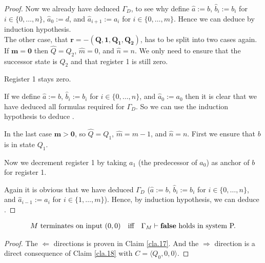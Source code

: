 \begin{proof}
	Now we already have deduced $\Gamma_D$, to see why define $\widehat{a}:=b$, $\widehat{b}_i:=b_i$ for $i\in\{0,\dots,n\}$, $\widehat{a}_0:=d$, and $\widehat{a}_{i+1}:=a_i$ for $i\in\{0,\dots,m\}$.
	Hence we can deduce \false{} by induction hypothesis.\\
	
	The other case, that $\boldsymbol{r=-(Q,1,Q_1,Q_2)}$, has to be split into two cases again. If $\boldsymbol{m=0}$ then $\widehat{Q}=Q_2$, $\widehat{m}=0$, and $\widehat{n}=n$. We only need to ensure that the successor state is $Q_2$ and that register 1 is still zero.
	
	\begin{figure}[H]
		\centering
		
	\end{figure}
	
	Register 1 stays zero.
	
	\begin{figure}[H]
		\centering
		
	\end{figure}
	
	If we define $\widehat{a}:=b$, $\widehat{b}_i:=b_i$ for $i\in\{0,\dots,n\}$, and $\widehat{a}_0:=a_0$ then it is clear that we have deduced all formulas required for $\Gamma_D$. So we can use the induction hypothesis to deduce \false{}.
	
	In the last case $\boldsymbol{m>0}$, so $\widehat{Q}=Q_1$, $\widehat{m}=m-1$, and $\widehat{n}=n$. First we ensure that $b$ is in state $Q_1$.
	
	\begin{figure}[H]
		\centering
		
	\end{figure}
	
	Now we decrement register 1 by taking $a_1$ (the predecessor of $a_0$) as anchor of $b$ for register 1.
	
	\begin{figure}[H]
		\centering
		
	\end{figure}
	
	Again it is obvious that we have deduced $\Gamma_D$ ($\widehat{a}:=b$, $\widehat{b}_i:=b_i$ for $i\in\{0,\dots,n\}$, and $\widehat{a}_{i-1}:=a_i$ for $i\in\{1,\dots,m\}$). Hence, by induction hypothesis, we can deduce \false{}.
\end{proof}

\begin{lemma}\label{lem.19}
	\begin{align*} %
		  & \text{$M$ terminates on input $(0,0)$} &   & \text{iff} & \text{$\Gamma_M\PModels\false$ holds in system P.} 
	\end{align*}
\end{lemma}
\begin{proof}
	The $\Leftarrow$ directions is proven in Claim \ref{cla.17}. And the $\Rightarrow$ direction is a direct consequence of Claim \ref{cla.18} with $C=\langle Q_0,0,0\rangle$.
\end{proof}


